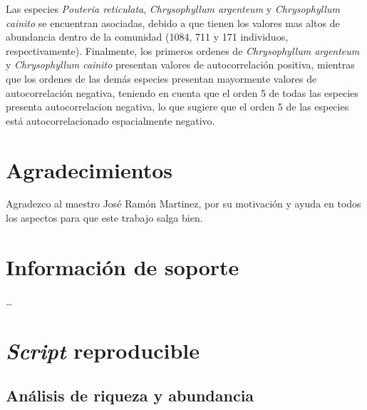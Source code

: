 \documentclass[11pt,]{article}
\begin{document}
Las especies \emph{Pouteria reticulata}, \emph{Chrysophyllum argenteum}
y \emph{Chrysophyllum cainito} se encuentran asociadas, debido a que
tienen los valores mas altos de abundancia dentro de la comunidad (1084,
711 y 171 individuos, respectivamente). Finalmente, los primeros ordenes
de \emph{Chrysophyllum argenteum} y \emph{Chrysophyllum cainito}
presentan valores de autocorrelación positiva, mientras que los ordenes
de las demás especies presentan mayormente valores de autocorrelación
negativa, teniendo en cuenta que el orden 5 de todas las especies
presenta autocorrelacion negativa, lo que sugiere que el orden 5 de las
especies está autocorrelacionado espacialmente negativo.

\section{Agradecimientos}\label{agradecimientos}

Agradezco al maestro José Ramón Martinez, por su motivación y ayuda en
todos los aspectos para que este trabajo salga bien.

\section{Información de soporte}\label{informaciuxf3n-de-soporte}

\ldots

\section{\texorpdfstring{\emph{Script}
reproducible}{Script reproducible}}\label{script-reproducible}

\subsection{Análisis de riqueza y
abundancia}\label{anuxe1lisis-de-riqueza-y-abundancia}
\end{document}
